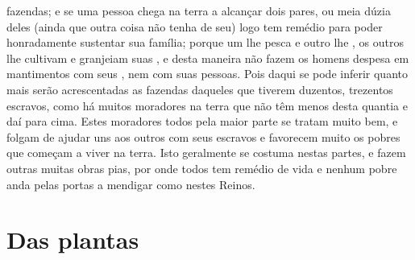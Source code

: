 fazendas; e se uma pessoa chega na terra a alcançar dois pares, ou meia
dúzia deles (ainda que outra coisa não tenha de seu) logo tem remédio
para poder honradamente sustentar sua família; porque um lhe pesca e				%
outro lhe , os outros lhe cultivam e granjeiam suas , e desta	%
maneira não fazem os homens despesa em mantimentos com seus ,
nem com suas pessoas. Pois daqui se pode inferir quanto mais serão
acrescentadas as fazendas daqueles que tiverem duzentos, trezentos
escravos, como há muitos moradores na terra que não têm menos desta
quantia e daí para cima. Estes moradores todos pela maior parte se
tratam muito bem, e folgam de ajudar uns aos outros com seus escravos e 
favorecem muito os pobres que começam a viver na terra. Isto geralmente 	%
se costuma nestas partes, e fazem outras muitas obras pias, por onde
todos tem remédio de vida e nenhum pobre anda pelas portas a mendigar
como nestes Reinos.



\chapter[Das plantas, mantimentos e frutas]{Das
plantas}




